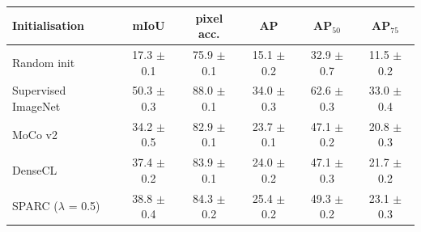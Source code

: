 \begin{tabular}{lccccc}
\toprule
  Initialisation & mIoU & pixel acc. & AP & AP$_{50}$ & AP$_{75}$ \\
\midrule
  Random init & 17.3 $\pm$ 0.1 & 75.9 $\pm$ 0.1 & 15.1 $\pm$ 0.2 & 32.9 $\pm$ 0.7 & 11.5 $\pm$ 0.2 \\
  Supervised ImageNet & 50.3 $\pm$ 0.3 & 88.0 $\pm$ 0.1 & 34.0 $\pm$ 0.3 & 62.6 $\pm$ 0.3 & 33.0 $\pm$ 0.4 \\
  MoCo v2 & 34.2 $\pm$ 0.5 & 82.9 $\pm$ 0.1 & 23.7 $\pm$ 0.1 & 47.1 $\pm$ 0.2 & 20.8 $\pm$ 0.3 \\
  DenseCL & 37.4 $\pm$ 0.2 & 83.9 $\pm$ 0.1 & 24.0 $\pm$ 0.2 & 47.1 $\pm$ 0.3 & 21.7 $\pm$ 0.2 \\
  SPARC ($\lambda$ = 0.5) & 38.8 $\pm$ 0.4 & 84.3 $\pm$ 0.2 & 25.4 $\pm$ 0.2 & 49.3 $\pm$ 0.2 & 23.1 $\pm$ 0.3 \\
\bottomrule
\end{tabular}
